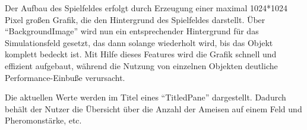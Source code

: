 \documentclass[a4paper,12pt]{scrartcl}
\begin{document}
Der Aufbau des Spielfeldes erfolgt durch Erzeugung einer maximal 1024*1024 Pixel großen Grafik, die den Hintergrund des Spielfeldes darstellt. Über "`BackgroundImage"' wird nun ein entsprechender Hintergrund für das Simulationsfeld gesetzt, das dann solange wiederholt wird, bis das Objekt komplett bedeckt ist. Mit Hilfe dieses Features wird die Grafik schnell und effizient aufgebaut, während die Nutzung von einzelnen Objekten deutliche Performance-Einbuße verursacht.

Die aktuellen Werte werden im Titel eines "`TitledPane"' dargestellt. Dadurch behält der Nutzer die Übersicht über die Anzahl der Ameisen auf einem Feld und Pheromonstärke, etc.
\end{document}
